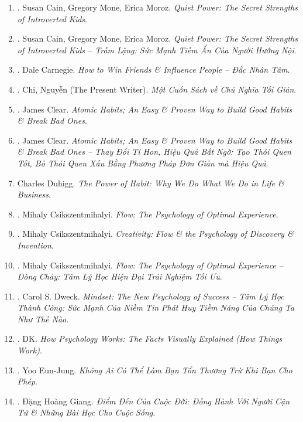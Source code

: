 \documentclass{article}
\begin{document}
\begin{enumerate}
	\item \cite{Cain_Mone_Moroz2017}. Susan Cain, Gregory Mone, Erica Moroz. \textit{Quiet Power: The Secret Strengths of Introverted Kids}.\hfill{\sf[reading]}
	\item \cite{Cain_Mone_Moroz2023}. Susan Cain, Gregory Mone, Erica Moroz. \textit{Quiet Power: The Secret Strengths of Introverted Kids -- Trầm Lặng: Sức Mạnh Tiềm Ẩn Của Người Hướng Nội}.\hfill{\sf[finished]}
	\item \cite{Carnegie2021}. Dale Carnegie. \textit{How to Win Friends \& Influence People -- Đắc Nhân Tâm}.\hfill{\sf[finished]}
	\item \cite{Chi2022}. Chi, Nguyễn (The Present Writer). \textit{Một Cuốn Sách về Chủ Nghĩa Tối Giản}. \hfill{\sf[finished]}
	\item \cite{Clear2018}. James Clear. \textit{Atomic Habits; An Easy \& Proven Way to Build Good Habits \& Break Bad Ones}.\hfill{\sf[reading]}
	\item \cite{Clear2022}. James Clear. \textit{Atomic Habits; An Easy \& Proven Way to Build Good Habits \& Break Bad Ones -- Thay Đổi Tí Hon, Hiệu Quả Bất Ngờ: Tạo Thói Quen Tốt, Bỏ Thói Quen Xấu Bằng Phương Pháp Đơn Giản mà Hiệu Quả}.\hfill{\sf[finished]}
	\item Charles Duhigg. \textit{The Power of Habit: Why We Do What We Do in Life \& Business}.
	\item \cite{Csikszentmihalyi2008}. Mihaly Csikszentmihalyi. \textit{Flow: The Psychology of Optimal Experience}.\hfill{\sf[reading]}
	\item \cite{Csikszentmihalyi2013}. Mihaly Csikszentmihalyi. \textit{Creativity: Flow \& the Psychology of Discovery \& Invention}.\hfill{\sf[reading]}
	\item \cite{Csikszentmihalyi2021}. Mihaly Csikszentmihalyi. \textit{Flow: The Psychology of Optimal Experience -- Dòng Chảy: Tâm Lý Học Hiện Đại Trải Nghiệm Tối Ưu}.\hfill{\sf[finished]}
	\item \cite{Dweck_mindset}. Carol S. Dweck. \textit{Mindset: The New Psychology of Success -- Tâm Lý Học Thành Công: Sức Mạnh Của Niềm Tin Phát Huy Tiềm Năng Của Chúng Ta Như Thế Nào}.\hfill\hfill{\sf[finished]}
	\item \cite{DK2018}. DK. \textit{How Psychology Works: The Facts Visually Explained (How Things Work)}.\hfill{\sf[reading]} 
	\item \cite{Eun-Jung2023}. Yoo Eun-Jung. \textit{Không Ai Có Thể Làm Bạn Tổn Thương Trừ Khi Bạn Cho Phép}.\hfill{\sf[finished]} 
	\item \cite{Giang2022a}. Đặng Hoàng Giang. \textit{Điểm Đến Của Cuộc Đời: Đồng Hành Với Người Cận Tử \& Những Bài Học Cho Cuộc Sống}.\\\mbox{}\hfill{\sf[finished]}

\end{enumerate}
\end{document}
